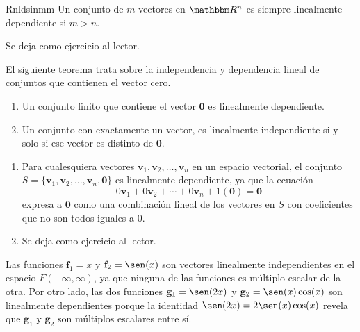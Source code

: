 \begin{theorem}{}{Rnldsinmm}
    Un conjunto de $m$ vectores en $\RR[n]$ es siempre linealmente dependiente si $m > n$.

    \tcblower
    \demostracion Se deja como ejercicio al lector.
\end{theorem}

El siguiente teorema trata sobre la independencia y dependencia lineal de conjuntos que contienen el vector cero.

\begin{theorem}{}{}
    \begin{enumerate}[label=\roman*), topsep=6pt, itemsep=0pt]
        \item Un conjunto finito que contiene el vector $\mathbf{0}$ es linealmente dependiente.
        \item Un conjunto con exactamente un vector, es linealmente independiente si y solo si ese vector es distinto de $\mathbf{0}$.
    \end{enumerate}

    \tcblower
    \demostracion
    \begin{enumerate}[label=\roman*), topsep=6pt, itemsep=0pt]
        \item Para cualesquiera vectores $\mathbf{v}_1, \mathbf{v}_2, \dots, \mathbf{v}_n$ en un espacio vectorial, el conjunto $S = \{\mathbf{v}_1, \mathbf{v}_2, \dots, \mathbf{v}_n, \mathbf{0}\}$ es linealmente dependiente, ya que la ecuación
        $$0\mathbf{v}_1 + 0\mathbf{v}_2 + \cdots + 0\mathbf{v}_n + 1(\mathbf{0}) = \mathbf{0}$$
        expresa a $\mathbf{0}$ como una combinación lineal de los vectores en $S$ con coeficientes que no son todos iguales a $0$.
        \item Se deja como ejercicio al lector.
    \end{enumerate}
\end{theorem}

\begin{examplebox}{}{}
    Las funciones $\mathbf{f}_1 = x$ y $\mathbf{f}_2 = \sen(x)$ son vectores linealmente independientes en el espacio $F(-\infty, \infty)$, ya que ninguna de las funciones es múltiplo escalar de la otra. Por otro lado, las dos funciones $\mathbf{g}_1 = \sen(2x)$ y $\mathbf{g}_2 = \sen(x) \cos(x)$ son linealmente dependientes porque la identidad $\sen (2x) = 2 \sen(x) \cos(x)$ revela que $\mathbf{g}_1$ y $\mathbf{g}_2$ son múltiplos escalares entre sí.
\end{examplebox}

